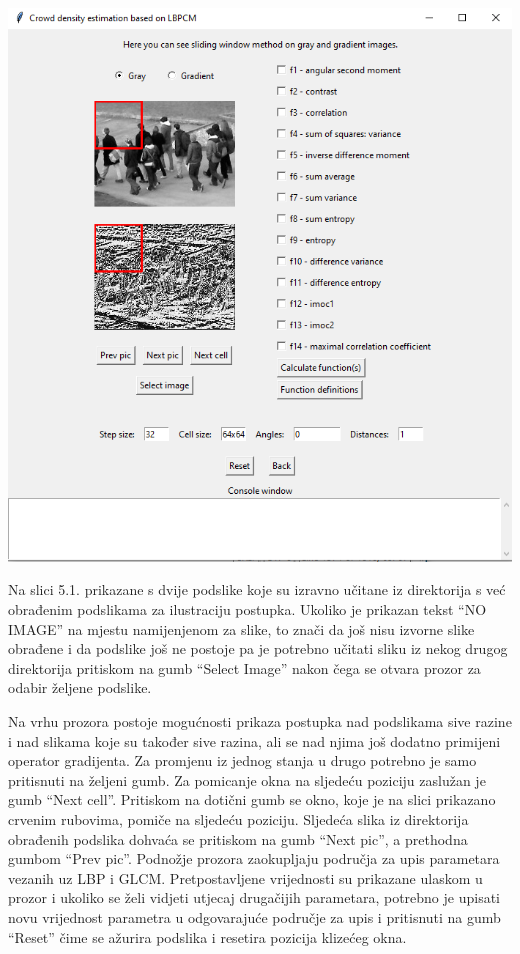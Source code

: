 \documentclass[times, utf8, zavrsni]{fer}
\begin{document}
\begin{minipage}{\linewidth}
\centering
\includegraphics[scale=0.6]{img/sw1.png}
\end{minipage}

\bigbreak

Na slici 5.1. prikazane s dvije podslike koje su izravno učitane iz direktorija
s već obrađenim podslikama za ilustraciju postupka. Ukoliko je prikazan tekst 
\enquote{NO IMAGE} na mjestu namijenjenom za slike, to znači da još nisu 
izvorne slike obrađene i da podslike 
još ne postoje pa je potrebno učitati sliku iz nekog drugog direktorija pritiskom 
na gumb \enquote{Select Image} nakon čega se otvara prozor za odabir željene podslike.

\newpage

Na vrhu prozora postoje mogućnosti prikaza postupka nad podslikama sive 
razine i nad slikama koje su također sive razina, ali se nad njima još dodatno 
primijeni operator gradijenta. Za promjenu iz jednog stanja u
drugo potrebno je samo pritisnuti na željeni gumb. Za pomicanje okna na sljedeću
poziciju zaslužan je gumb \enquote{Next cell}. Pritiskom na dotični gumb se okno, koje
je na slici prikazano crvenim rubovima, pomiče na sljedeću poziciju. Sljedeća slika iz 
direktorija obrađenih podslika dohvaća se pritiskom na gumb \enquote{Next pic}, a 
prethodna gumbom \enquote{Prev pic}. Podnožje prozora zaokupljaju 
područja za upis parametara vezanih uz LBP i GLCM. Pretpostavljene vrijednosti
su prikazane ulaskom u prozor i ukoliko se želi vidjeti utjecaj drugačijih parametara,
potrebno je upisati novu vrijednost parametra u odgovarajuće područje za upis i
pritisnuti na gumb \enquote{Reset} čime se ažurira podslika i resetira pozicija 
klizećeg okna.
\end{document}
